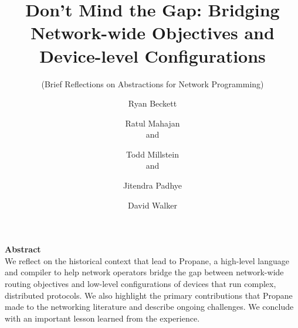 \documentclass[10pt]{sigalternate052015}
\newcommand{\sysname}{{\small \sf Propane}\xspace}
\begin{document}




\title{Don't Mind the Gap:  Bridging Network-wide Objectives and
  Device-level Configurations}

\subtitle{
  (Brief Reflections on Abstractions
  for Network Programming)
  }



\author{%
Ryan Beckett\\
\and
Ratul Mahajan\\
   and 
\and
Todd Millstein\\
   and 
\and
Jitendra Padhye\\
\and
David Walker\\
}

\maketitle


\noindent
\textbf{Abstract} \\
We reflect on the historical context that lead to 
\sysname,
a high-level language and compiler to help network operators
bridge the gap between network-wide routing objectives and low-level configurations of devices that run complex, distributed protocols.
We also highlight the primary contributions that Propane made to the
networking literature and describe ongoing challenges.
We conclude with an important lesson learned from the experience.



%
%
%
%
\end{document}

